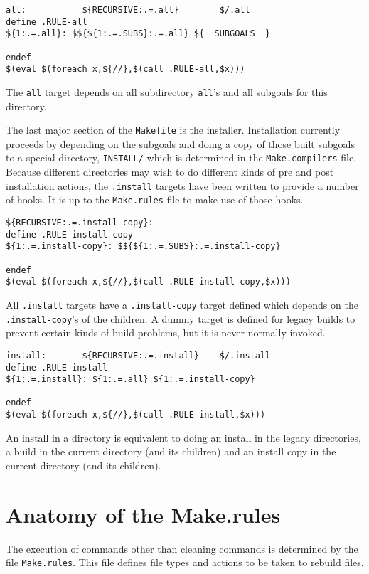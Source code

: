 \documentclass{article}
\begin{document}
\begin{verbatim}
all:           ${RECURSIVE:.=.all}        $/.all
define .RULE-all
${1:.=.all}: $${${1:.=.SUBS}:.=.all} ${__SUBGOALS__}

endef
$(eval $(foreach x,${//},$(call .RULE-all,$x)))
\end{verbatim}
The \verb+all+ target depends on all subdirectory \verb+all+'s
and all subgoals for this directory.


The last major section of the \verb+Makefile+ is the installer.
Installation currently proceeds by depending on the subgoals
and doing a copy of those built subgoals to a special directory,
\verb+INSTALL/+ which is determined in the \verb+Make.compilers+
file.  Because different directories may wish to do different
kinds of pre and post installation actions, the \verb+.install+
targets have been written to provide a number of hooks.  It is
up to the \verb+Make.rules+ file to make use of those hooks.

\begin{verbatim}
${RECURSIVE:.=.install-copy}:
define .RULE-install-copy
${1:.=.install-copy}: $${${1:.=.SUBS}:.=.install-copy}

endef
$(eval $(foreach x,${//},$(call .RULE-install-copy,$x)))
\end{verbatim}
All \verb+.install+ targets have a \verb+.install-copy+ target defined
which depends on the \verb+.install-copy+'s of the children.  A dummy
target is defined for legacy builds to prevent certain kinds of
build problems, but it is never normally invoked.

\begin{verbatim}
install:       ${RECURSIVE:.=.install}    $/.install
define .RULE-install
${1:.=.install}: ${1:.=.all} ${1:.=.install-copy}

endef
$(eval $(foreach x,${//},$(call .RULE-install,$x)))
\end{verbatim}
An install in a directory is equivalent to doing an install in
the legacy directories, a build in the current directory (and
its children) and an install copy in the current directory
(and its children).

\section{Anatomy of the Make.rules}

The execution of commands other than cleaning commands is
determined by the file \verb+Make.rules+.  This file defines
file types and actions to be taken to rebuild files.
\end{document}
